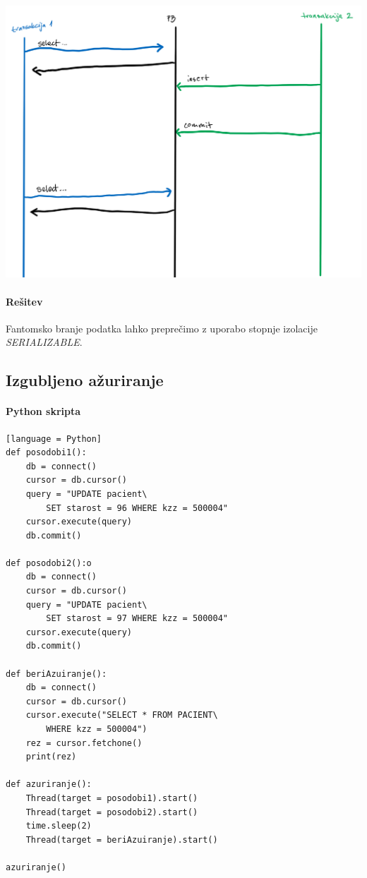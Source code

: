 \documentclass[a4paper,11pt]{report}
\begin{document}
\noindent\includegraphics[width=\linewidth]{./pics/phantom.png}

\paragraph{Rešitev}
Fantomsko branje podatka lahko preprečimo z uporabo stopnje izolacije \textit{SERIALIZABLE}.


\pagebreak
\subsection*{Izgubljeno ažuriranje}
\paragraph{Python skripta}\mbox{}
\begin{lstlisting}[showstringspaces=false][language = Python]
def posodobi1():
    db = connect()
    cursor = db.cursor()
    query = "UPDATE pacient\ 
        SET starost = 96 WHERE kzz = 500004"
    cursor.execute(query)
    db.commit()

def posodobi2():o
    db = connect()
    cursor = db.cursor()
    query = "UPDATE pacient\ 
        SET starost = 97 WHERE kzz = 500004"
    cursor.execute(query)
    db.commit()

def beriAzuiranje():
    db = connect()
    cursor = db.cursor()
    cursor.execute("SELECT * FROM PACIENT\ 
        WHERE kzz = 500004")
    rez = cursor.fetchone()
    print(rez)

def azuriranje():
    Thread(target = posodobi1).start()
    Thread(target = posodobi2).start()
    time.sleep(2)
    Thread(target = beriAzuiranje).start()

azuriranje()

\end{lstlisting}
\end{document}
